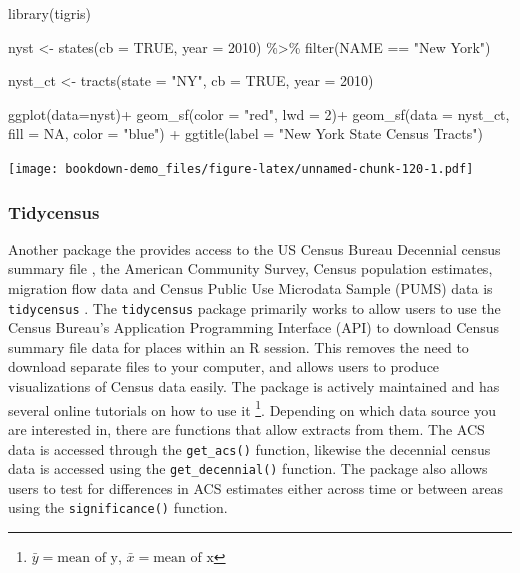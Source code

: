 \documentclass[
]{article}
\newenvironment{Shaded}{\begin{snugshade}}{\end{snugshade}}
\newcommand{\AttributeTok}[1]{\textcolor[rgb]{0.77,0.63,0.00}{#1}}
\newcommand{\ConstantTok}[1]{\textcolor[rgb]{0.00,0.00,0.00}{#1}}
\newcommand{\DecValTok}[1]{\textcolor[rgb]{0.00,0.00,0.81}{#1}}
\newcommand{\FunctionTok}[1]{\textcolor[rgb]{0.00,0.00,0.00}{#1}}
\newcommand{\NormalTok}[1]{#1}
\newcommand{\OtherTok}[1]{\textcolor[rgb]{0.56,0.35,0.01}{#1}}
\newcommand{\SpecialCharTok}[1]{\textcolor[rgb]{0.00,0.00,0.00}{#1}}
\newcommand{\StringTok}[1]{\textcolor[rgb]{0.31,0.60,0.02}{#1}}
\begin{document}
\begin{Shaded}
\begin{Highlighting}[]
\FunctionTok{library}\NormalTok{(tigris)}

\NormalTok{nyst }\OtherTok{\textless{}{-}} \FunctionTok{states}\NormalTok{(}\AttributeTok{cb =} \ConstantTok{TRUE}\NormalTok{,}
               \AttributeTok{year =} \DecValTok{2010}\NormalTok{) }\SpecialCharTok{\%\textgreater{}\%}
  \FunctionTok{filter}\NormalTok{(NAME }\SpecialCharTok{==} \StringTok{"New York"}\NormalTok{)}

\NormalTok{nyst\_ct }\OtherTok{\textless{}{-}} \FunctionTok{tracts}\NormalTok{(}\AttributeTok{state =} \StringTok{"NY"}\NormalTok{,}
                  \AttributeTok{cb =} \ConstantTok{TRUE}\NormalTok{,}
                  \AttributeTok{year =} \DecValTok{2010}\NormalTok{)}

\FunctionTok{ggplot}\NormalTok{(}\AttributeTok{data=}\NormalTok{nyst)}\SpecialCharTok{+}
  \FunctionTok{geom\_sf}\NormalTok{(}\AttributeTok{color =} \StringTok{"red"}\NormalTok{, }
          \AttributeTok{lwd =} \DecValTok{2}\NormalTok{)}\SpecialCharTok{+}
   \FunctionTok{geom\_sf}\NormalTok{(}\AttributeTok{data =}\NormalTok{ nyst\_ct,}
           \AttributeTok{fill =} \ConstantTok{NA}\NormalTok{,}
           \AttributeTok{color =} \StringTok{"blue"}\NormalTok{) }\SpecialCharTok{+} 
  \FunctionTok{ggtitle}\NormalTok{(}\AttributeTok{label =} \StringTok{"New York State Census Tracts"}\NormalTok{)}
\end{Highlighting}
\end{Shaded}

\texttt{[image: bookdown-demo\_files/figure-latex/unnamed-chunk-120-1.pdf]}

\hypertarget{tidycensus}{%
\subsubsection{Tidycensus}\label{tidycensus}}

Another package the provides access to the US Census Bureau Decennial census summary file , the American Community Survey, Census population estimates, migration flow data and Census Public Use Microdata Sample (PUMS) data is \texttt{tidycensus} \citep{walker21}. The \texttt{tidycensus} package primarily works to allow users to use the Census Bureau's Application Programming Interface (API) to download Census summary file data for places within an R session. This removes the need to download separate files to your computer, and allows users to produce visualizations of Census data easily. The package is actively maintained and has several online tutorials on how to use it \footnote{\(\bar{y}= \text{mean of y}\), \(\bar{x}= \text{mean of x}\)}. Depending on which data source you are interested in, there are functions that allow extracts from them. The ACS data is accessed through the \texttt{get\_acs()} function, likewise the decennial census data is accessed using the \texttt{get\_decennial()} function. The package also allows users to test for differences in ACS estimates either across time or between areas using the \texttt{significance()} function.
\end{document}
